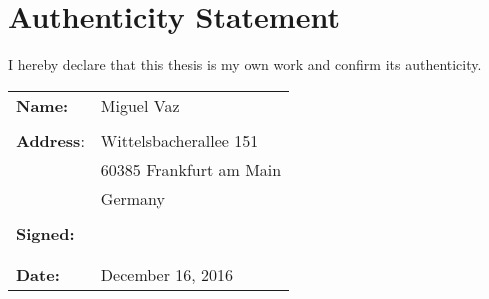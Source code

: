 \chapter*{Authenticity Statement} %
\label{cha:authenticity_statement}

I hereby declare that this thesis is my own work and confirm its authenticity.

\vspace{1cm}
\begin{tabular}{l l}

\textbf{Name:} & Miguel Vaz\\
\\
\textbf{Address}: & Wittelsbacherallee 151\\
& 60385 Frankfurt am Main\\
& Germany\\
\\
\textbf{Signed:}& \\
\\
\\
\textbf{Date:}& December 16, 2016\\
\end{tabular}


